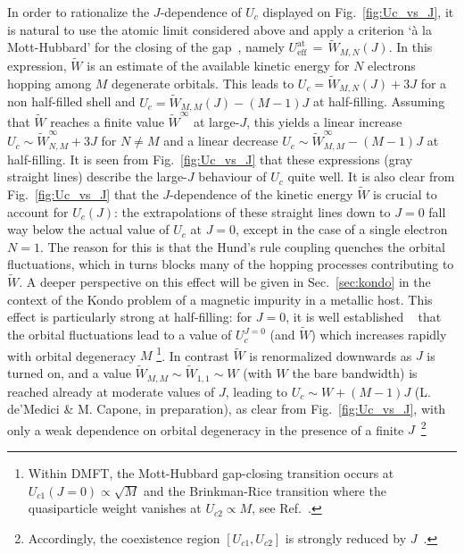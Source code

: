 \documentclass[]{ar2e-changed}%
\def\Ueff{U_{\mathrm{eff}}}
\def\Wt{\widetilde{W}}
\begin{document}
In order to rationalize the $J$-dependence of $U_c$ displayed on Fig.~\ref{fig:Uc_vs_J}, 
it is natural to use the atomic limit considered above and apply a criterion `\`a la Mott-Hubbard' 
for the closing of the gap~\cite{demedici_MottHund}, namely $\Ueff^{\mathrm{at}}\,=\,\Wt_{M,N}(J)$. 
%
In this expression, $\Wt$ is an estimate of the available kinetic energy for $N$ electrons 
hopping among $M$ degenerate orbitals. 
%
This leads to $U_c=\Wt_{M,N}(J)+3J$ for a non half-filled shell and $U_c=\Wt_{M,M}(J)-(M-1)J$ at half-filling.
%
Assuming that $\Wt$ reaches a finite value $\Wt^\infty$ at large-$J$, this yields a linear increase 
$U_c\sim \Wt_{N,M}^\infty+3J$ for $N\neq M$ and a linear decrease 
$U_c\sim \Wt_{M,M}^\infty-(M-1)J$ at half-filling. 
%
It is seen from Fig.~\ref{fig:Uc_vs_J} that these expressions (gray straight lines) describe the large-$J$ 
behaviour of $U_c$ quite well. 
%
It is also clear from Fig.~\ref{fig:Uc_vs_J} that the $J$-dependence 
of the kinetic energy $\Wt$ is crucial to account for $U_c(J)$: the extrapolations of these 
straight lines down to $J=0$ fall way below the actual value of $U_c$ at $J=0$, except in the case of a 
single electron $N=1$. 
%
The reason for this is that the Hund's rule coupling quenches the orbital fluctuations, which  
in turns blocks many of the hopping processes contributing to $\Wt$. 
%
A deeper perspective on this effect will be given in Sec.~\ref{sec:kondo} in the context of the Kondo 
problem of a magnetic impurity in a metallic host. 
%
This effect is particularly strong at half-filling: for $J=0$, it is well established
~\cite{lu_MIT_prb_1994,gunnarsson_orbital_1997_prb,
han_multiorbital,florens_orbital_2002_prb}
that the orbital fluctuations lead to a value of 
$U_c^{J=0}$ (and $\Wt$) which increases rapidly with orbital degeneracy $M$
\footnote{Within DMFT, the Mott-Hubbard gap-closing transition 
occurs at $U_{c1}(J=0)\propto \sqrt{M}$ and the Brinkman-Rice transition where the 
quasiparticle weight vanishes at $U_{c2}\propto M$, see Ref.~\cite{florens_orbital_2002_prb}.}. 
%
In contrast $\Wt$ is renormalized downwards as $J$ is turned on, and a value 
$\Wt_{M,M}\sim\Wt_{1,1}\sim W$ (with $W$ the bare bandwidth) is reached already at 
moderate values of $J$, leading to $U_c\sim W+(M-1)J$%
 (L. de'Medici \& M. Capone, in preparation), as clear from Fig.~\ref{fig:Uc_vs_J}, with only
a weak dependence on  orbital degeneracy in the presence 
of a finite $J$~\footnote{Accordingly, the coexistence region $[U_{c1},U_{c2}]$ is strongly reduced by $J$~\cite{inaba_prb_2005}.}
\end{document}
